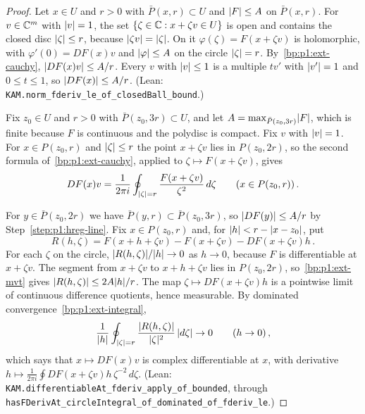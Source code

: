 \begin{proof}
\label{step:p1:hreg-line}
Let $x\in U$ and $r>0$ with $\bar P(x,r)\subset U$ and $\lvert F\rvert\le A$ on $\bar P(x,r)$. For $v\in\mathbb{C}^m$
with $\lvert v\rvert=1$, the set $\{\zeta\in\mathbb{C}:x+\zeta v\in U\}$ is open and contains the closed disc
$\lvert \zeta\rvert\le r$, because $\lvert \zeta v\rvert=\lvert \zeta\rvert$. On it $\varphi(\zeta)=F(x+\zeta v)$ is holomorphic,
with $\varphi'(0)=DF(x)v$ and $\lvert \varphi\rvert\le A$ on the circle $\lvert \zeta\rvert=r$. By~\ref{bp:p1:ext-cauchy},
$\lvert DF(x)v\rvert\le A/r$. Every $v$ with $\lvert v\rvert\le1$ is a multiple $tv'$ with $\lvert v'\rvert=1$ and
$0\le t\le1$, so $\lvert DF(x)\rvert\le A/r$. (Lean: \nolinkurl{KAM.norm_fderiv_le_of_closedBall_bound}.)

\label{step:p1:hreg-integral}
Fix $z_0\in U$ and $r>0$ with $\bar P(z_0,3r)\subset U$, and let $A=\max_{\bar P(z_0,3r)}\lvert F\rvert$, which
is finite because $F$ is continuous and the polydisc is compact. Fix $v$ with $\lvert v\rvert=1$. For
$x\in P(z_0,r)$ and $\lvert \zeta\rvert\le r$ the point $x+\zeta v$ lies in $P(z_0,2r)$, so the second formula
of~\ref{bp:p1:ext-cauchy}, applied to $\zeta\mapsto F(x+\zeta v)$, gives
\begin{equation*}
DF(x)v=\frac1{2\pi i}\oint_{\lvert \zeta\rvert=r}\frac{F(x+\zeta v)}{\zeta^2}\,d\zeta\qquad(x\in P(z_0,r))\,.
\end{equation*}

\label{step:p1:hreg-differentiate}
For $y\in\bar P(z_0,2r)$ we have $\bar P(y,r)\subset\bar P(z_0,3r)$, so $\lvert DF(y)\rvert\le A/r$ by
Step~\ref{step:p1:hreg-line}. Fix $x\in P(z_0,r)$ and, for $\lvert h\rvert<r-\lvert x-z_0\rvert$, put
\begin{equation*}
R(h,\zeta)=F(x+h+\zeta v)-F(x+\zeta v)-DF(x+\zeta v)h\,.
\end{equation*}
For each $\zeta$ on the circle, $\lvert R(h,\zeta)\rvert/\lvert h\rvert\to0$ as $h\to0$, because $F$ is differentiable
at $x+\zeta v$. The segment from $x+\zeta v$ to $x+h+\zeta v$ lies in $P(z_0,2r)$, so~\ref{bp:p1:ext-mvt}
gives $\lvert R(h,\zeta)\rvert\le2A\lvert h\rvert/r$. The map $\zeta\mapsto DF(x+\zeta v)h$ is a pointwise limit of
continuous difference quotients, hence measurable. By dominated convergence~\ref{bp:p1:ext-integral},
\begin{equation*}
\frac1{\lvert h\rvert}\oint_{\lvert \zeta\rvert=r}\frac{\lvert R(h,\zeta)\rvert}{\lvert \zeta\rvert^2}\,\lvert d\zeta\rvert\to0\qquad(h\to0)\,,
\end{equation*}
which says that $x\mapsto DF(x)v$ is complex differentiable at $x$, with derivative
$h\mapsto\frac1{2\pi i}\oint DF(x+\zeta v)h\,\zeta^{-2}\,d\zeta$. (Lean:
\nolinkurl{KAM.differentiableAt_fderiv_apply_of_bounded}, through
\nolinkurl{hasFDerivAt_circleIntegral_of_dominated_of_fderiv_le}.)


\end{proof}
